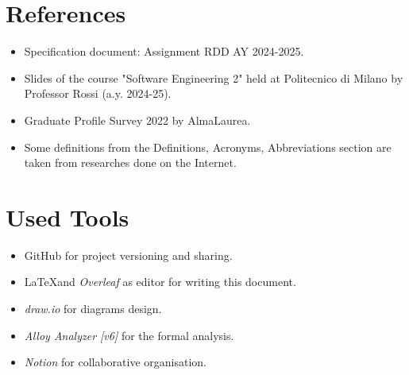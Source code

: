 \section{References}
\begin{itemize}
    \item Specification document: Assignment RDD AY 2024-2025. 
    \item Slides of the course "Software Engineering 2" held at Politecnico di Milano by Professor Rossi (a.y. 2024-25).
    \item Graduate Profile Survey 2022 by AlmaLaurea.
    \item Some definitions from the Definitions, Acronyms, Abbreviations section are taken from researches done on the Internet.
\end{itemize}
\section{Used Tools}
\begin{itemize}
    \item GitHub for project versioning and sharing.
    \item \LaTeX\space and \textit{Overleaf} as editor for writing this document.
    \item \textit{draw.io} for diagrams design.
    \item \textit{Alloy Analyzer [v6]} for the formal analysis.
    \item \textit{Notion} for collaborative organisation.
\end{itemize}
